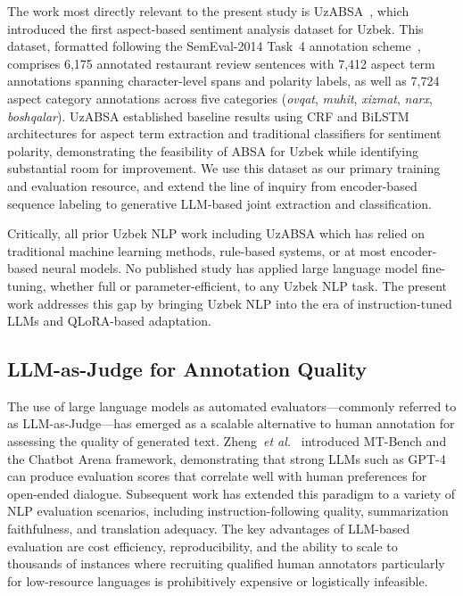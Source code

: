 \documentclass[runningheads]{llncs}
\newcommand{\etal}{\textit{et al.}}
\begin{document}
The work most directly relevant to the present study is UzABSA~\cite{matlatipov2024uzabsa}, which introduced the first aspect-based sentiment analysis dataset for Uzbek. This dataset, formatted following the SemEval-2014 Task~4 annotation scheme~\cite{pontiki-etal-2014-semeval}, comprises 6{,}175 annotated restaurant review sentences with 7{,}412 aspect term annotations spanning character-level spans and polarity labels, as well as 7{,}724 aspect category annotations across five categories (\textit{ovqat}, \textit{muhit}, \textit{xizmat}, \textit{narx}, \textit{boshqalar}). UzABSA established baseline results using CRF and BiLSTM architectures for aspect term extraction and traditional classifiers for sentiment polarity, demonstrating the feasibility of ABSA for Uzbek while identifying substantial room for improvement. We use this dataset as our primary training and evaluation resource, and extend the line of inquiry from encoder-based sequence labeling to generative LLM-based joint extraction and classification.

Critically, all prior Uzbek NLP work including UzABSA which has relied on traditional machine learning methods, rule-based systems, or at most encoder-based neural models. No published study has applied large language model fine-tuning, whether full or parameter-efficient, to any Uzbek NLP task. The present work addresses this gap by bringing Uzbek NLP into the era of instruction-tuned LLMs and QLoRA-based adaptation.

\subsection{LLM-as-Judge for Annotation Quality}
\label{sec:rw_judge}

The use of large language models as automated evaluators---commonly referred to as LLM-as-Judge---has emerged as a scalable alternative to human annotation for assessing the quality of generated text. Zheng~\etal~\cite{10.5555/3666122.3668142} introduced MT-Bench and the Chatbot Arena framework, demonstrating that strong LLMs such as GPT-4 can produce evaluation scores that correlate well with human preferences for open-ended dialogue. Subsequent work has extended this paradigm to a variety of NLP evaluation scenarios, including instruction-following quality, summarization faithfulness, and translation adequacy. The key advantages of LLM-based evaluation are cost efficiency, reproducibility, and the ability to scale to thousands of instances where recruiting qualified human annotators particularly for low-resource languages is prohibitively expensive or logistically infeasible.
\end{document}
